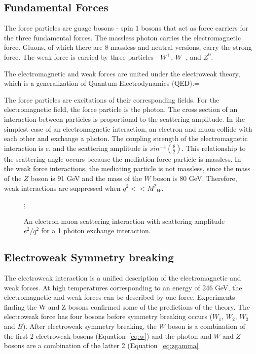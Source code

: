 \subsection{Fundamental Forces}

The force particles are guage bosons - spin 1 bosons that act as force carriers for the three fundamental forces. The massless photon carries the electromagnetic force. Gluons, of which there are 8 massless and neutral versions, carry the strong force. The weak force is carried by three particles - $W^+$, $W^-$, and $Z^0$. 

The electromagnetic and weak forces are united under the electroweak theory, which is a generalization of Quantum Electrodynamics (QED).=

The force particles are excitations of their corresponding fields. For the electromagnetic field, the force particle is the photon. The cross section of an interaction between particles is proportional to the scattering amplitude. In the simplest case of an electromagnetic interaction, an electron and muon collide with each other and exchange a photon. The coupling strength of the electromagnetic interaction is $e$, and the scattering amplitude is $sin^{-4}(\frac{\theta}{2})$. This relationship to the scattering angle occurs because the mediation force particle is massless. In the weak force interactions, the mediating particle is not massless, since the mass of the $Z$ boson is 91 GeV and the mass of the $W$ boson is 80 GeV. Therefore, weak interactions are suppressed when $q^2 << {M^{2}}_{W}$.

\begin{figure}
	\centering
	;
	\caption{An electron muon scattering interaction with scattering amplitude $e^2/q^2$ for a 1 photon exchange interaction.}
	\label{fig:feynman_ee}
\end{figure}

\subsection{Electroweak Symmetry breaking}

The electroweak interaction is a unified description of the electromagnetic and weak forces. At high temperatures corresponding to an energy of 246 GeV, the electromagnetic and weak forces can be described by one force. Experiments finding the W and Z bosons confirmed some of the predictions of the theory. The electroweak force has four bosons before symmetry breaking occurs ($W_1$, $W_2$, $W_3$ and $B$). After electroweak symmetry breaking, the $W$ boson is a combination of the first 2 electroweak bosons (Equation~\ref{eq:w}) and the photon and $W$ and $Z$ bosons are a combination of the latter 2 (Equation~\ref{eq:zgamma} 


